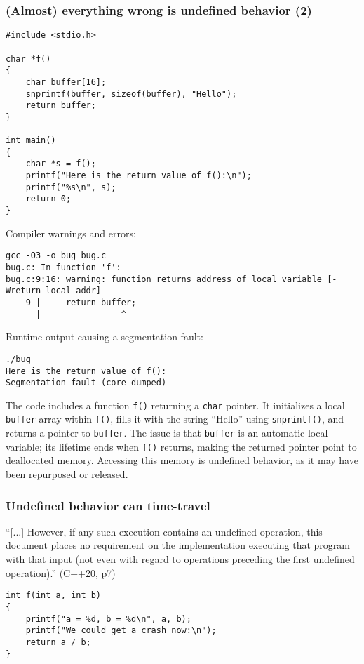 \documentclass[12pt]{article}
\begin{document}
\subsubsection{(Almost) everything wrong is undefined behavior (2)}
\begin{lstlisting}
#include <stdio.h>

char *f()
{
    char buffer[16]; 
    snprintf(buffer, sizeof(buffer), "Hello");
    return buffer;
}

int main()
{
    char *s = f();
    printf("Here is the return value of f():\n");
    printf("%s\n", s);
    return 0;
}
\end{lstlisting}
Compiler warnings and errors:
\begin{lstlisting}
gcc -O3 -o bug bug.c
bug.c: In function 'f':
bug.c:9:16: warning: function returns address of local variable [-Wreturn-local-addr]
    9 |     return buffer;
      |                ^
\end{lstlisting}
Runtime output causing a segmentation fault:
\begin{lstlisting}
./bug
Here is the return value of f():
Segmentation fault (core dumped)
\end{lstlisting}
The code includes a function \texttt{f()} returning a \texttt{char} pointer. It initializes a local \texttt{buffer} array within \texttt{f()}, fills it with the string ``Hello'' using \texttt{snprintf()}, and returns a pointer to \texttt{buffer}. The issue is that \texttt{buffer} is an automatic local variable; its lifetime ends when \texttt{f()} returns, making the returned pointer point to deallocated memory. Accessing this memory is undefined behavior, as it may have been repurposed or released.


\subsubsection{Undefined behavior can time-travel}

``[...] However, if any such execution contains an undefined operation,
this document places no requirement on the implementation executing
that program with that input (not even with regard to operations
preceding the first undefined operation).''
(C++20, p7)

\begin{lstlisting}
int f(int a, int b)
{
    printf("a = %d, b = %d\n", a, b);
    printf("We could get a crash now:\n");
    return a / b;
}
\end{lstlisting}
\end{document}
